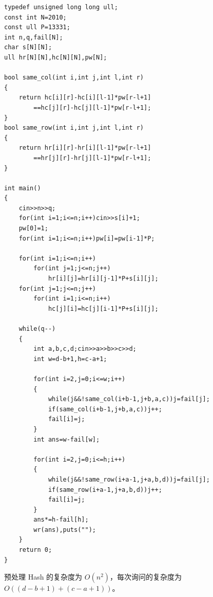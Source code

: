\begin{verbatim}
typedef unsigned long long ull;
const int N=2010;
const ull P=13331;
int n,q,fail[N];
char s[N][N];
ull hr[N][N],hc[N][N],pw[N];

bool same_col(int i,int j,int l,int r)
{
    return hc[i][r]-hc[i][l-1]*pw[r-l+1]
        ==hc[j][r]-hc[j][l-1]*pw[r-l+1];
}
bool same_row(int i,int j,int l,int r)
{
    return hr[i][r]-hr[i][l-1]*pw[r-l+1]
        ==hr[j][r]-hr[j][l-1]*pw[r-l+1];
}

int main()
{
    cin>>n>>q;
    for(int i=1;i<=n;i++)cin>>s[i]+1;
    pw[0]=1;
    for(int i=1;i<=n;i++)pw[i]=pw[i-1]*P;

    for(int i=1;i<=n;i++)
        for(int j=1;j<=n;j++)
            hr[i][j]=hr[i][j-1]*P+s[i][j];
    for(int j=1;j<=n;j++)
        for(int i=1;i<=n;i++)
            hc[j][i]=hc[j][i-1]*P+s[i][j];

    while(q--)
    {
        int a,b,c,d;cin>>a>>b>>c>>d;
        int w=d-b+1,h=c-a+1;

        for(int i=2,j=0;i<=w;i++)
        {
            while(j&&!same_col(i+b-1,j+b,a,c))j=fail[j];
            if(same_col(i+b-1,j+b,a,c))j++;
            fail[i]=j;
        }
        int ans=w-fail[w];

        for(int i=2,j=0;i<=h;i++)
        {
            while(j&&!same_row(i+a-1,j+a,b,d))j=fail[j];
            if(same_row(i+a-1,j+a,b,d))j++;
            fail[i]=j;
        }
        ans*=h-fail[h];
        wr(ans),puts("");
    }
    return 0;
}
\end{verbatim}

预处理 Hash 的复杂度为 $O(n^2)$，每次询问的复杂度为
$O((d-b+1)+(c-a+1))$。
